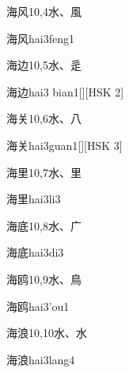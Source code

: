 \begin{entry}{海风}{10,4}{⽔、⾵}
  \begin{phonetics}{海风}{hai3feng1}
  \end{phonetics}
\end{entry}

\begin{entry}{海边}{10,5}{⽔、⾡}
  \begin{phonetics}{海边}{hai3 bian1}[][HSK 2]
  \end{phonetics}
\end{entry}

\begin{entry}{海关}{10,6}{⽔、⼋}
  \begin{phonetics}{海关}{hai3guan1}[][HSK 3]
  \end{phonetics}
\end{entry}

\begin{entry}{海里}{10,7}{⽔、⾥}
  \begin{phonetics}{海里}{hai3li3}
  \end{phonetics}
\end{entry}

\begin{entry}{海底}{10,8}{⽔、⼴}
  \begin{phonetics}{海底}{hai3di3}
  \end{phonetics}
\end{entry}

\begin{entry}{海鸥}{10,9}{⽔、⿃}
  \begin{phonetics}{海鸥}{hai3'ou1}
  \end{phonetics}
\end{entry}

\begin{entry}{海浪}{10,10}{⽔、⽔}
  \begin{phonetics}{海浪}{hai3lang4}
  \end{phonetics}
\end{entry}

